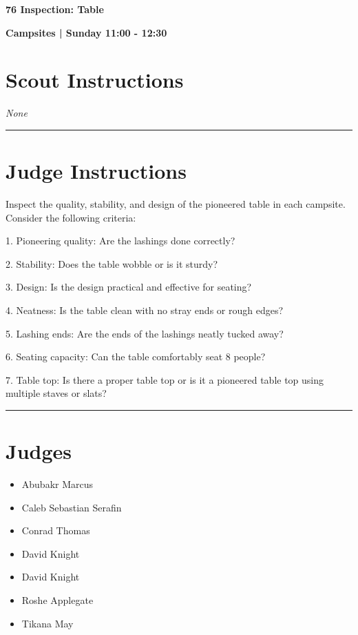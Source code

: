 \documentclass[10pt]{article}
\newcommand{\newtitle}[1]{\begin{center}{\Huge\bfseries #1 }\\ \vspace{5mm}\end{center}}
\newcommand{\newsubtitle}[1]{\begin{center}{\color{grey}\Large\bfseries #1 }\\ \vspace{5mm}\end{center}}
\begin{document}
	\vspace{1cm}


	\clearpage
		\newtitle{76 Inspection: Table }
	\newsubtitle{Campsites | Sunday 11:00 - 12:30}
		\setcounter{section}{75}
	\section*{Scout Instructions}
		\textit{None}
	
	\vspace{0.5cm}
	\hrule
	\vspace{0.5cm}

		\section*{Judge Instructions}
		Inspect the quality, stability, and design of the pioneered table in each campsite. Consider the following criteria:



1. Pioneering quality: Are the lashings done correctly?

2. Stability: Does the table wobble or is it sturdy?

3. Design: Is the design practical and effective for seating?

4. Neatness: Is the table clean with no stray ends or rough edges?

5. Lashing ends: Are the ends of the lashings neatly tucked away?

6. Seating capacity: Can the table comfortably seat 8 people?

7. Table top: Is there a proper table top or is it a pioneered table top using multiple staves or slats?


\vspace{0.5cm}
	\hrule
	\vspace{0.5cm}
		\section*{\faUsers \: Judges}

		

	\begin{multicols}{2}

		\begin{itemize}
									\item Abubakr Marcus
									\item Caleb Sebastian Serafin
									\item Conrad Thomas
									\item David Knight
						\end{itemize}

		\vfill\null
		\columnbreak

		\begin{itemize}
									\item David Knight
									\item Roshe Applegate
									\item Tikana May
						\end{itemize}

		\vfill\null

		\end{multicols}
\end{document}
